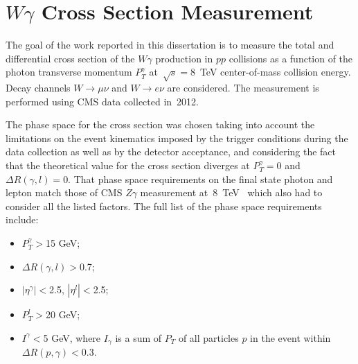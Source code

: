 \chapter{$W\gamma$ Cross Section Measurement}
\label{sec:AN_WgMeas}

The goal of the work reported in this dissertation is to measure the total and differential cross section of the $W\gamma$ production in $pp$ collisions as a function of the photon transverse momentum $P_T^\gamma$ at~$\sqrt{s}=$8~TeV center-of-mass collision energy. Decay channels $W\rightarrow\mu\nu$ and $W\rightarrow e\nu$ are considered. The measurement is performed using CMS data collected in~2012.

The phase space for the cross section was chosen taking into account the limitations on the event kinematics imposed by the trigger conditions during the data collection as well as by the detector acceptance, and considering the fact that the theoretical value for the cross section diverges at $P_T^{\gamma}=$0 and $\Delta{R}(\gamma,l)=$0. That phase space requirements on the final state photon and lepton match those of CMS $Z\gamma$ measurement at~8~TeV~\cite{ref_Zg8TeV} which also had to consider all the listed factors. The full list of the phase space requirements include:
\begin{itemize}
  \item $P_T^{\gamma}>$15 GeV;
  \item $\Delta{R}(\gamma,l) > $0.7;
  \item $|\eta^{\gamma}|<$2.5, $|\eta^{l}|<$2.5;
  \item $P_T^{l}>$20 GeV;
  \item $I^{\gamma}<$5 GeV, where $I_{\gamma}$ is a sum of $P_T$ of all particles $p$ in the event within $\Delta{R(p,\gamma)}<$0.3.
\end{itemize}
